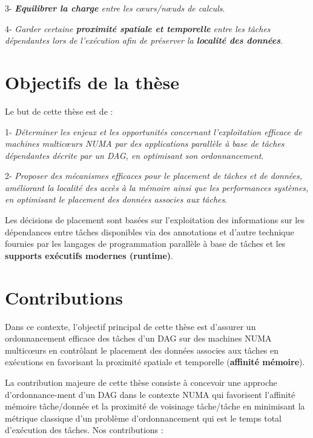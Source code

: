 \justify \hspace{\parindent}
3- \textit{\textbf{Equilibrer la charge} entre les cœurs/nœuds de calculs}.

\justify \hspace{\parindent}
4- \textit{Garder certaine \textbf{proximité spatiale et temporelle} entre les tâches dépendantes lors de l'exécution afin de préserver la \textbf{localité des données}}.

\section{Objectifs de la thèse} 
\justify \hspace{\parindent}
Le but de cette thèse est de :

\justify \hspace{\parindent}
1- \textit{Déterminer les enjeux et les opportunités concernant l'exploitation efficace de machines multicœurs NUMA par des applications parallèle à base de tâches dépendantes décrite par un DAG, en optimisant son ordonnancement}.

\justify \hspace{\parindent}
2- \textit{Proposer des mécanismes efficaces pour le placement de tâches et de données, améliorant la localité des accès à la mémoire ainsi que les performances systèmes, en optimisant le placement des données associes aux tâches}. 

\justify \hspace{\parindent}
Les décisions de placement sont basées sur l'exploitation des informations sur les dépendances entre tâches disponibles via des annotations et d'autre technique fournies par les langages de programmation parallèle à base de tâches et les \textbf{supports exécutifs modernes (runtime)}. 

\section{Contributions} 
\justify \hspace{\parindent}
Dans ce contexte, l'objectif principal de cette thèse est  d'assurer un ordonnancement efficace des tâches d'un DAG sur des machines NUMA multicœurs en contrôlant le placement des données associes aux tâches en exécutions en favorisant la proximité spatiale et temporelle (\textbf{affinité mémoire}). 

\justify \hspace{\parindent}
La contribution majeure de cette thèse consiste à concevoir une approche d'ordonnance-ment d'un DAG dans le contexte NUMA qui favorisent l'affinité mémoire tâche/donnée et la proximité de voisinage tâche/tâche en minimisant la métrique classique d'un problème d'ordonnancement qui est le temps total d'exécution des tâches. Nos contributions : 

